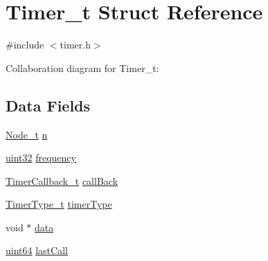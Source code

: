 \hypertarget{structTimer__t}{\section{Timer\+\_\+t Struct Reference}
\label{structTimer__t}
}


{\ttfamily \#include $<$timer.\+h$>$}



Collaboration diagram for Timer\+\_\+t\+:
\subsection*{Data Fields}
\begin{DoxyCompactItemize}
\item 
\hyperlink{structNode__t}{Node\+\_\+t} \hyperlink{structTimer__t_affec7fa3a3a0590d323226c36ff15306}{n}
\item 
\hyperlink{type_8h_acbd4acd0d29e2d6c43104827f77d9cd2}{uint32} \hyperlink{structTimer__t_aa70a6bd0e8333ae2245c412704faa357}{frequency}
\item 
\hyperlink{timer_8h_ac5c819a8fa882baaec7af7b44dd53b7a}{Timer\+Callback\+\_\+t} \hyperlink{structTimer__t_a33c0f386f5764104c03581b350480fb2}{call\+Back}
\item 
\hyperlink{timer_8h_a416f6a76c245a140c4ceb81dbe81266a}{Timer\+Type\+\_\+t} \hyperlink{structTimer__t_a0d9bfe383c4d6298247ed58db898516d}{timer\+Type}
\item 
void $\ast$ \hyperlink{structTimer__t_a9de9f00a3de549669d10703a2fe82700}{data}
\item 
\hyperlink{type_8h_abc0f5bc07737e498f287334775dff2b6}{uint64} \hyperlink{structTimer__t_a94aa32e419e8a720f13ec257f58587fc}{last\+Call}
\end{DoxyCompactItemize}


